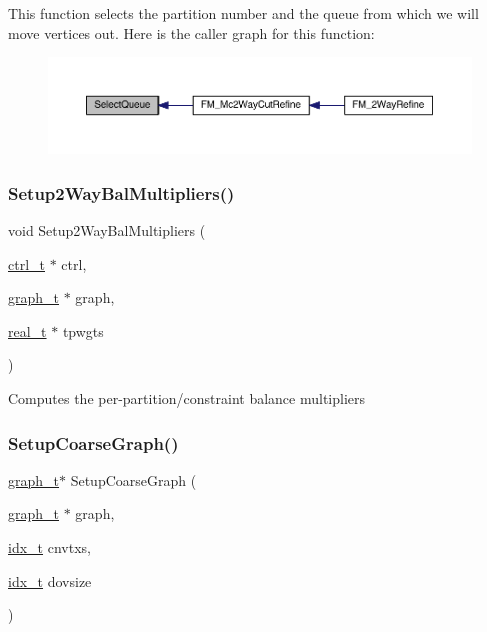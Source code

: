 This function selects the partition number and the queue from which we will move vertices out. Here is the caller graph for this function\+:\nopagebreak
\begin{figure}[H]
\begin{center}
\leavevmode
\includegraphics[width=350pt]{a00945_a51193f4b76d298d94234642136879390_icgraph}
\end{center}
\end{figure}
\mbox{\label{a00945_ab7bde9f22de07a798b97f1f8e83768b1}} 
\subsubsection{\texorpdfstring{Setup2\+Way\+Bal\+Multipliers()}{Setup2WayBalMultipliers()}}
{\footnotesize\ttfamily void Setup2\+Way\+Bal\+Multipliers (\begin{DoxyParamCaption}\item[{\hyperlink{a00742}{ctrl\+\_\+t} $\ast$}]{ctrl,  }\item[{\hyperlink{a00734}{graph\+\_\+t} $\ast$}]{graph,  }\item[{\hyperlink{a00876_a1924a4f6907cc3833213aba1f07fcbe9}{real\+\_\+t} $\ast$}]{tpwgts }\end{DoxyParamCaption})}

Computes the per-\/partition/constraint balance multipliers \mbox{\label{a00945_a113522304bf628b09d0b69b4db05050e}} 
\subsubsection{\texorpdfstring{Setup\+Coarse\+Graph()}{SetupCoarseGraph()}}
{\footnotesize\ttfamily \hyperlink{a00734}{graph\+\_\+t}$\ast$ Setup\+Coarse\+Graph (\begin{DoxyParamCaption}\item[{\hyperlink{a00734}{graph\+\_\+t} $\ast$}]{graph,  }\item[{\hyperlink{a00876_aaa5262be3e700770163401acb0150f52}{idx\+\_\+t}}]{cnvtxs,  }\item[{\hyperlink{a00876_aaa5262be3e700770163401acb0150f52}{idx\+\_\+t}}]{dovsize }\end{DoxyParamCaption})}


